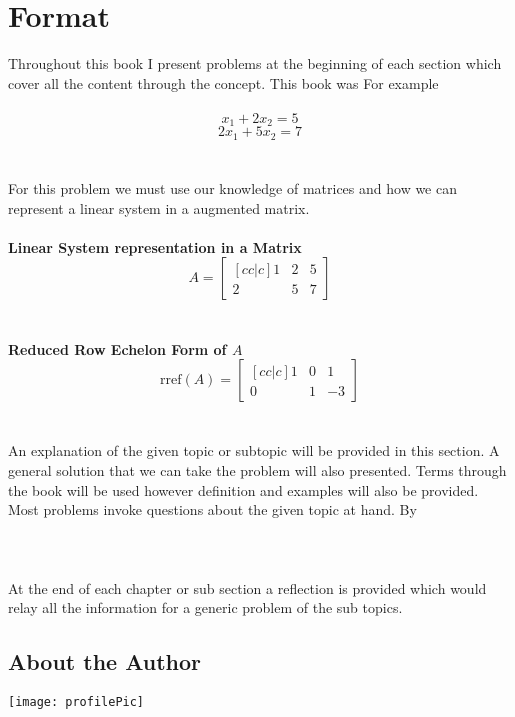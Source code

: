 \documentclass[12pt]{article}
\begin{document}
\section*{Format}
Throughout this book I present problems at the beginning of each section which cover all the content through the concept. This book was For example\\\\
\begin{equation*}x_1+2x_2=5
\end{equation*}
\begin{equation*}2x_1+5x_2=7
\end{equation*}
\\\\
For this problem we must use our knowledge of matrices and how we can represent a linear system in a augmented matrix.
\\\\ \textbf{Linear System representation in a Matrix}
\begin{equation*}
A = \begin{bmatrix}[c c| c]
1 & 2 & 5 \\
2 & 5 & 7
\end{bmatrix}
\end{equation*}
\\\\ \textbf{Reduced Row Echelon Form of $A$}
\begin{equation*}
\text{rref}(A) = \begin{bmatrix}[c c| c]
1 & 0 & 1 \\
0 & 1 & -3
\end{bmatrix}
\end{equation*}
\\\\
An explanation of the given topic or subtopic will be provided in this section. A general solution that we can take the problem will also presented. Terms through the book will be used however definition and examples will also be provided. Most problems invoke questions about the given topic at hand. By \\\\
\\\\
At the end of each chapter or sub section a reflection is provided which would relay all the information for a generic problem of the sub topics.
\begin{center}
\newpage
\section*{About the Author}
    \texttt{[image: profilePic]}
\end{center}
\end{document}
